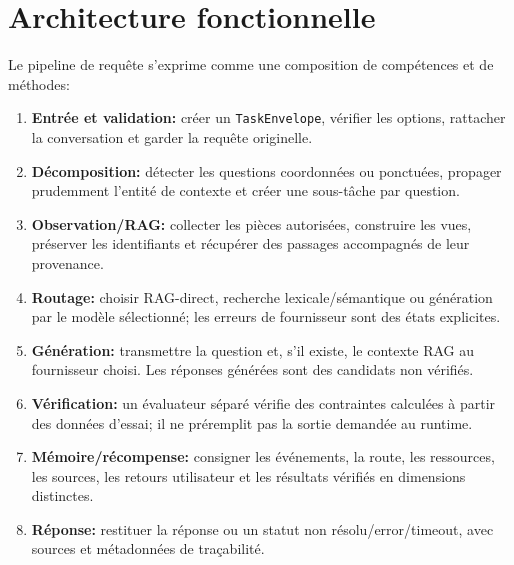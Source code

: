 \documentclass[11pt,a4paper]{article}
\begin{document}
\section{Architecture fonctionnelle}
Le pipeline de requête s'exprime comme une composition de compétences et de méthodes:
\begin{enumerate}[leftmargin=1.7em]
\item \textbf{Entrée et validation:} créer un \texttt{TaskEnvelope}, vérifier les options, rattacher la conversation et garder la requête originelle.
\item \textbf{Décomposition:} détecter les questions coordonnées ou ponctuées, propager prudemment l'entité de contexte et créer une sous-tâche par question.
\item \textbf{Observation/RAG:} collecter les pièces autorisées, construire les vues, préserver les identifiants et récupérer des passages accompagnés de leur provenance.
\item \textbf{Routage:} choisir RAG-direct, recherche lexicale/sémantique ou génération par le modèle sélectionné; les erreurs de fournisseur sont des états explicites.
\item \textbf{Génération:} transmettre la question et, s'il existe, le contexte RAG au fournisseur choisi. Les réponses générées sont des candidats non vérifiés.
\item \textbf{Vérification:} un évaluateur séparé vérifie des contraintes calculées à partir des données d'essai; il ne préremplit pas la sortie demandée au runtime.
\item \textbf{Mémoire/récompense:} consigner les événements, la route, les ressources, les sources, les retours utilisateur et les résultats vérifiés en dimensions distinctes.
\item \textbf{Réponse:} restituer la réponse ou un statut non résolu/error/timeout, avec sources et métadonnées de traçabilité.
\end{enumerate}
\end{document}

